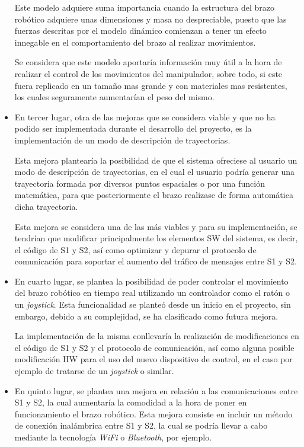 \begin{itemize}
    Este modelo adquiere suma importancia cuando la estructura del brazo robótico adquiere unas dimensiones y masa no despreciable, puesto que las fuerzas descritas por el modelo dinámico comienzan a tener un efecto innegable en el comportamiento del brazo al realizar movimientos.
    
    Se considera que este modelo aportaría información muy útil a la hora de realizar el control de los movimientos del manipulador, sobre todo, si este fuera replicado en un tamaño mas grande y con materiales mas resistentes, los cuales seguramente aumentarían el peso del mismo.
    
    \item En tercer lugar, otra de las mejoras que se considera viable y que no ha podido ser implementada durante el desarrollo del proyecto, es la implementación de un modo de descripción de trayectorias.
    
    Esta mejora plantearía la posibilidad de que el sistema ofreciese al usuario un modo de descripción de trayectorias, en el cual el usuario podría generar una trayectoria formada por diversos puntos espaciales o por una función matemática, para que posteriormente el brazo realizase de forma automática dicha trayectoria.
    
    Esta mejora se considera una de las más viables y para su implementación, se tendrían que modificar principalmente los elementos \ac{SW} del sistema, es decir, el código de \ac{S1} y \ac{S2}, así como optimizar y depurar el protocolo de comunicación para soportar el aumento del tráfico de mensajes entre \ac{S1} y \ac{S2}.
    
    \item En cuarto lugar, se plantea la posibilidad de poder controlar el movimiento del brazo robótico en tiempo real utilizando un controlador como el ratón o un \textit{joystick}. Esta funcionalidad se planteó desde un inicio en el proyecto, sin embargo, debido a su complejidad, se ha clasificado como futura mejora.
    
    La implementación de la misma conllevaría la realización de modificaciones en el código de \ac{S1} y \ac{S2} y el protocolo de comunicación, así como alguna posible modificación \ac{HW} para el uso del nuevo dispositivo de control, en el caso por ejemplo de tratarse de un \textit{joystick} o similar.
    
    \item En quinto lugar, se plantea una mejora en relación a las comunicaciones entre \ac{S1} y \ac{S2}, la cual aumentaría la comodidad a la hora de poner en funcionamiento el brazo robótico. Esta mejora consiste en incluir un método de conexión inalámbrica entre \ac{S1} y \ac{S2}, la cual se podría llevar a cabo mediante la tecnología \textit{WiFi} o \textit{Bluetooth}, por ejemplo.
    

\end{itemize}
